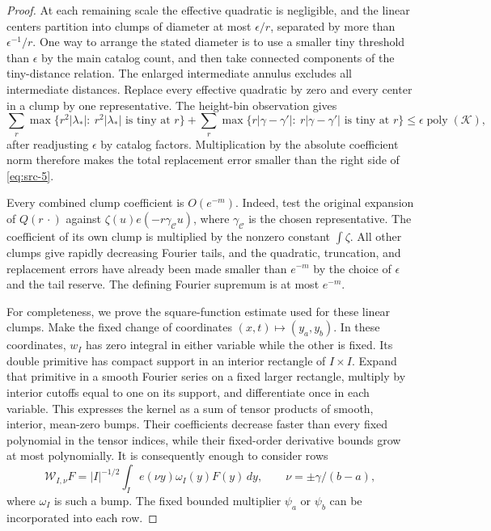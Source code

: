 \begin{proof}
At each remaining scale the effective quadratic is negligible, and the
linear centers partition into clumps of diameter at most $\epsilon/r$,
separated by more than $\epsilon^{-1}/r$.  One way to arrange the stated
diameter is to use a smaller tiny threshold than $\epsilon$ by the main
catalog count, and then take connected components of the tiny-distance
relation.  The enlarged intermediate annulus excludes all intermediate
distances.  Replace every effective quadratic by zero and every center
in a clump by one representative.  The height-bin observation gives
\[
 \sum_r\max\{r^2|\lambda_*|:\ r^2|\lambda_*|\text{ is tiny at }r\}
 +\sum_r\max\{r|\gamma-\gamma'|:\
                       r|\gamma-\gamma'|\text{ is tiny at }r\}
 \le \epsilon\operatorname{poly}(\mathcal K),
\]
after readjusting $\epsilon$ by catalog factors.  Multiplication by the
absolute coefficient norm therefore makes the total replacement error
smaller than the right side of \eqref{eq:src-5}.

Every combined clump coefficient is $O(e^{-m})$.  Indeed, test the
original expansion of $Q(r\,\cdot)$ against
$\zeta(u)e(-r\gamma_{\mathcal C}u)$, where
$\gamma_{\mathcal C}$ is the chosen representative.  The coefficient
of its own clump is multiplied by the nonzero constant $\int\zeta$.
All other clumps give rapidly decreasing Fourier tails, and the
quadratic, truncation, and replacement errors have already been made
smaller than $e^{-m}$ by the choice of $\epsilon$ and the tail reserve.
The defining Fourier supremum is at most $e^{-m}$.

For completeness, we prove the square-function estimate used for these
linear clumps.  Make the fixed change of coordinates
$(x,t)\mapsto(y_a,y_b)$.  In these coordinates, $w_I$ has zero integral
in either variable while the other is fixed.  Its double primitive has
compact support in an interior rectangle of $I\times I$.  Expand that
primitive in a smooth Fourier series on a fixed larger rectangle,
multiply by interior cutoffs equal to one on its support, and
differentiate once in each variable.  This expresses the kernel as a
sum of tensor products of smooth, interior, mean-zero bumps.  Their
coefficients decrease faster than every fixed polynomial in the tensor
indices, while their fixed-order derivative bounds grow at most
polynomially.  It is consequently enough to consider rows
\[
 \mathcal W_{I,\nu}F
   =|I|^{-1/2}\int_I e(\nu y)\omega_I(y)F(y)\,dy,
 \qquad \nu=\pm\gamma/(b-a),
\]
where $\omega_I$ is such a bump.  The fixed bounded multiplier $\psi_a$
or $\psi_b$ can be incorporated into each row.


\end{proof}
